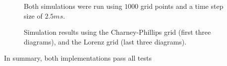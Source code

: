 \begin{figure}[!h]
    \caption{Simulation results using the Charney-Phillips grid (first three diagrams), and the Lorenz grid (last three diagrams).}
    \label{fig:simulations}
    \small
Both simulations were run using $1000$ grid points and a time step size of $2.5ms$.
\end{figure}


In summary, both implementations pass all tests




